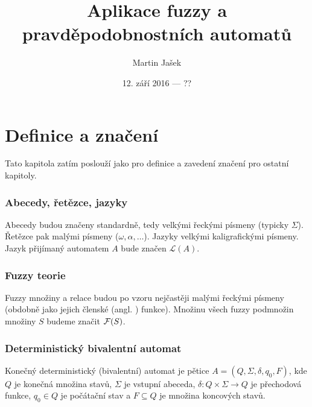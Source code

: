 \documentclass[a4paper,10pt]{article}
\title{Aplikace fuzzy a pravděpodobnostních automatů}
\author{Martin Jašek}
\date{12. září 2016 --- ??}
\begin{document}
\maketitle
\tableofcontents
\newpage

\section{Definice a značení}
Tato kapitola zatím poslouží jako  pro definice a zavedení značení pro ostatní kapitoly.

\subsubsection*{Abecedy, řetězce, jazyky}
Abecedy budou značeny standardně, tedy velkými řeckými písmeny (typicky $\Sigma$). Řetězce pak malými písmeny ($\omega, \alpha, \dots$). Jazyky velkými kaligrafickými písmeny. Jazyk přijímaný automatem $A$ bude značen $\mathcal{L}(A)$.

\subsubsection*{Fuzzy teorie}
Fuzzy množiny a relace budou po vzoru \cite{AstGonMenGar-FuzzAutEpsMovCmpFuzzMeasBtwStrs} nejčastěji malými řeckými písmeny (obdobně jako jejich členské (angl. ) funkce). Množinu všech fuzzy podmnožin množiny $S$ budeme značit $\mathcal{F}(S)$.

\subsubsection*{Deterministický bivalentní automat}


\begin{definition}
 Konečný deterministický (bivalentní) automat je pětice $A = ( Q, \Sigma, \delta, q_0, F )$, kde $Q$ je konečná množina stavů, $\Sigma$ je vstupní abeceda, $\delta: Q \times \Sigma \rightarrow Q$ je přechodová funkce, $q_0 \in Q$ je počátační stav a $F \subseteq Q$ je množina koncových stavů.
\end{definition}
\end{document}

